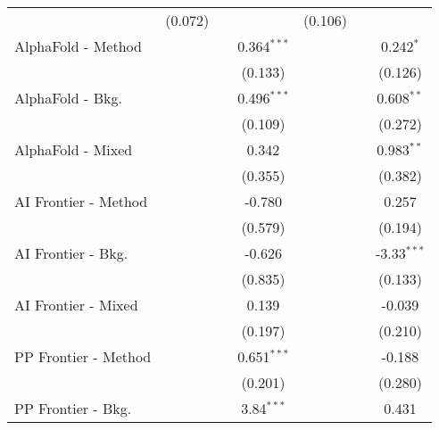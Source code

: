 \begin{tabular}{lcccccc}
                                  & (0.072)        &               &                & (0.106)        &              &   \\   
   AlphaFold - Method             &                &               & 0.364$^{***}$  &                &              & 0.242$^{*}$\\   
                                  &                &               & (0.133)        &                &              & (0.126)\\   
   AlphaFold - Bkg.               &                &               & 0.496$^{***}$  &                &              & 0.608$^{**}$\\   
                                  &                &               & (0.109)        &                &              & (0.272)\\   
   AlphaFold - Mixed              &                &               & 0.342          &                &              & 0.983$^{**}$\\   
                                  &                &               & (0.355)        &                &              & (0.382)\\   
   AI Frontier - Method           &                &               & -0.780         &                &              & 0.257\\   
                                  &                &               & (0.579)        &                &              & (0.194)\\   
   AI Frontier - Bkg.             &                &               & -0.626         &                &              & -3.33$^{***}$\\   
                                  &                &               & (0.835)        &                &              & (0.133)\\   
   AI Frontier - Mixed            &                &               & 0.139          &                &              & -0.039\\   
                                  &                &               & (0.197)        &                &              & (0.210)\\   
   PP Frontier - Method           &                &               & 0.651$^{***}$  &                &              & -0.188\\   
                                  &                &               & (0.201)        &                &              & (0.280)\\   
   PP Frontier - Bkg.             &                &               & 3.84$^{***}$   &                &              & 0.431\\   

\end{tabular}
